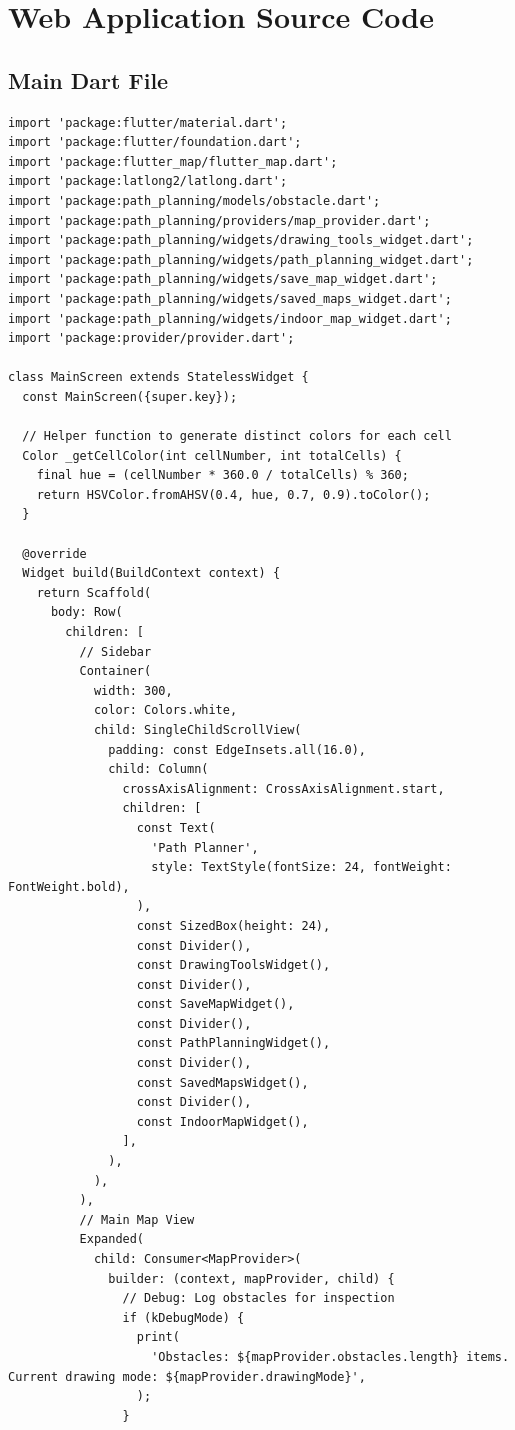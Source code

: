 \chapter{Web Application Source Code}
\section{Main Dart File}
\begin{lstlisting}
import 'package:flutter/material.dart';
import 'package:flutter/foundation.dart';
import 'package:flutter_map/flutter_map.dart';
import 'package:latlong2/latlong.dart';
import 'package:path_planning/models/obstacle.dart';
import 'package:path_planning/providers/map_provider.dart';
import 'package:path_planning/widgets/drawing_tools_widget.dart';
import 'package:path_planning/widgets/path_planning_widget.dart';
import 'package:path_planning/widgets/save_map_widget.dart';
import 'package:path_planning/widgets/saved_maps_widget.dart';
import 'package:path_planning/widgets/indoor_map_widget.dart';
import 'package:provider/provider.dart';

class MainScreen extends StatelessWidget {
  const MainScreen({super.key});

  // Helper function to generate distinct colors for each cell
  Color _getCellColor(int cellNumber, int totalCells) {
    final hue = (cellNumber * 360.0 / totalCells) % 360;
    return HSVColor.fromAHSV(0.4, hue, 0.7, 0.9).toColor();
  }

  @override
  Widget build(BuildContext context) {
    return Scaffold(
      body: Row(
        children: [
          // Sidebar
          Container(
            width: 300,
            color: Colors.white,
            child: SingleChildScrollView(
              padding: const EdgeInsets.all(16.0),
              child: Column(
                crossAxisAlignment: CrossAxisAlignment.start,
                children: [
                  const Text(
                    'Path Planner',
                    style: TextStyle(fontSize: 24, fontWeight: FontWeight.bold),
                  ),
                  const SizedBox(height: 24),
                  const Divider(),
                  const DrawingToolsWidget(),
                  const Divider(),
                  const SaveMapWidget(),
                  const Divider(),
                  const PathPlanningWidget(),
                  const Divider(),
                  const SavedMapsWidget(),
                  const Divider(),
                  const IndoorMapWidget(),
                ],
              ),
            ),
          ),
          // Main Map View
          Expanded(
            child: Consumer<MapProvider>(
              builder: (context, mapProvider, child) {
                // Debug: Log obstacles for inspection
                if (kDebugMode) {
                  print(
                    'Obstacles: ${mapProvider.obstacles.length} items. Current drawing mode: ${mapProvider.drawingMode}',
                  );
                }


\end{lstlisting}
